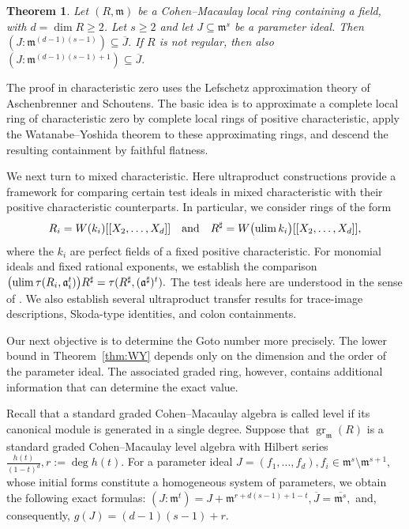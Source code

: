 \documentclass[11pt,a4paper]{amsart}
\numberwithin{equation}{section}
\newtheorem{theorem}{Theorem}[section]
\begin{document}
\begin{theorem}
	\label{thm:field}
	Let $(R,\mathfrak m)$ be a Cohen--Macaulay local ring containing
	a field, with $d=\dim R\geq 2$. Let $s\geq 2$ and let
	$J\subseteq\mathfrak m^s$ be a parameter ideal. Then
	$(J:\mathfrak m^{(d-1)(s-1)})\subseteq\overline J.	$
	If $R$ is not regular, then also
	$(J:\mathfrak m^{(d-1)(s-1)+1})\subseteq\overline J.	$
\end{theorem}

The proof in characteristic zero uses the Lefschetz approximation
theory of Aschenbrenner and Schoutens. The basic idea is to
approximate a complete local ring of characteristic zero by
complete local rings of positive characteristic, apply the
Watanabe--Yoshida theorem to these approximating rings, and
descend the resulting containment by faithful flatness.



We next turn to mixed characteristic. Here ultraproduct
constructions provide a framework for comparing certain
test ideals in mixed characteristic with their positive
characteristic counterparts. In particular, we consider rings
of the form
$$R_i=W(k_i)[[X_2,\ldots,X_d]]
\quad\text{and}\quad
R^\sharp=W\bigl(\operatorname*{ulim} k_i\bigr)[[X_2,\ldots,X_d]],$$
where the $k_i$ are perfect fields of a fixed positive
characteristic. For monomial ideals and fixed rational
exponents, we establish the comparison
$\bigl(\operatorname*{ulim}\tau(R_i,\mathfrak a_i^t)\bigr)R^\sharp
=
\tau(R^\sharp,(\mathfrak a^\sharp)^t).$
The test ideals here are understood in the sense of
\cite[Definition 8.13]{BMP}. We also establish several
ultraproduct transfer results for trace-image descriptions,
Skoda-type identities, and colon containments.



Our next objective is to determine the Goto number more
precisely. The lower bound in Theorem~\ref{thm:WY} depends
only on the dimension and the order of the parameter ideal.
The associated graded ring, however, contains additional
information that can determine the exact value.

Recall that a standard graded Cohen--Macaulay algebra is called
level if its canonical module is generated in a single degree.
Suppose that
$\operatorname{gr}_{\mathfrak m}(R)$
is a standard graded Cohen--Macaulay level algebra with Hilbert
series
$\frac{h(t)}{(1-t)^d},r:=\deg h(t).$
For a parameter ideal
$J=(f_1,\ldots,f_d),f_i\in\mathfrak m^s\setminus\mathfrak m^{s+1},$
whose initial forms constitute a homogeneous system of
parameters, we obtain the following exact formulas:
$(J:\mathfrak m^t)=J+\mathfrak m^{r+d(s-1)+1-t},
\overline J=\overline{\mathfrak m^s},$
and, consequently,
${g(J)=(d-1)(s-1)+r.}$
\end{document}
